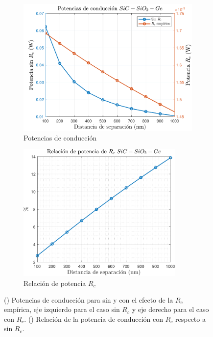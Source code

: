 \begin{figure}[H]
	\centering
	\begin{subfigure}[b]{0.49\textwidth}
		\centering
			\includegraphics[width=1\textwidth]{figuras/Resultados/conduccion/pdf/Prc_SiCSiO2Ge.pdf}
		\caption{Potencias de conducción}
		\label{fig:Prc_SiCSiO2Ge}
	\end{subfigure}
	\hfill
	\begin{subfigure}[b]{0.49\textwidth}
		\centering
			\includegraphics[width=0.9\textwidth]{figuras/Resultados/conduccion/pdf/relPrc_SiCSiO2Ge.pdf}
		\caption{Relación de potencia $R_c$}
		\label{fig:relPrc_SiCSiO2Ge}
	\end{subfigure}
	\caption{() Potencias de conducción para sin y con el efecto de la $R_c$ empírica, eje izquierdo para el caso sin $R_c$ y eje derecho para el caso con $R_c$. () Relación de la potencia de conducción con $R_c$ respecto a sin $R_c$.}
	\label{fig:PrcCond_SiCSiO2Ge}
\end{figure}

